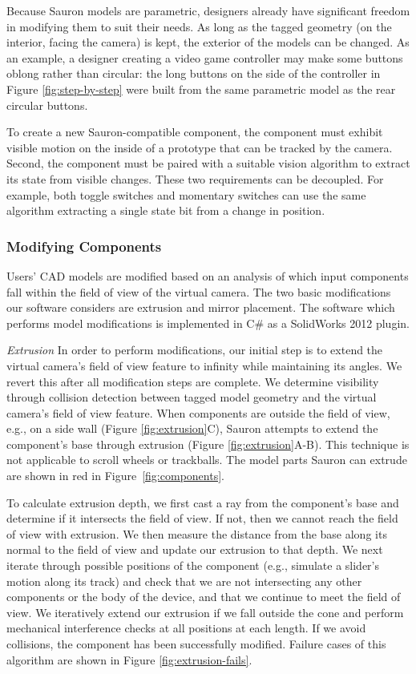 Because Sauron models are parametric, designers already have significant freedom in modifying them to suit their needs. As long as the tagged geometry (on the interior, facing the camera) is kept, the exterior of the models can be changed. As an example, a designer creating a video game controller may make some buttons oblong rather than circular: the long buttons on the side of the controller in Figure \ref{fig:step-by-step} were built from the same parametric model as the rear circular buttons.

To create a new Sauron-compatible component, the component must exhibit visible motion on the inside of a prototype that can be tracked by the camera. Second, the component must be paired with a suitable vision algorithm to extract its state from visible changes. These two requirements can be decoupled. 
For example, both toggle switches and momentary switches can use the same algorithm extracting a single state bit from a change in position.

\subsubsection{Modifying Components}
Users' CAD models are modified based on an analysis of which input components fall within the field of view of the virtual camera. The two basic modifications our software considers are extrusion and mirror placement. The software which performs model modifications is implemented in C\# as a SolidWorks 2012 plugin. 

\emph{Extrusion}
In order to perform modifications, our initial step is to extend the virtual camera's field of view feature to infinity while maintaining its angles. We revert this after all modification steps are complete. We determine visibility through collision detection between tagged model geometry and the virtual camera's field of view feature.
When components are outside the field of view, e.g., on a side wall (Figure \ref{fig:extrusion}C), Sauron attempts to extend the component's base through extrusion (Figure \ref{fig:extrusion}A-B). This technique is not applicable to scroll wheels or trackballs. The model parts Sauron can extrude are shown in red in Figure~\ref{fig:components}.

To calculate extrusion depth, we first cast a ray from the component's base and determine if it intersects the field of view. If not, then we cannot reach the field of view with extrusion. We then measure the distance from the base along its normal to the field of view and update our extrusion to that depth. We next iterate through possible positions of the component (e.g., simulate a slider's motion along its track) and check that we are not intersecting any other components or the body of the device, and that we continue to meet the field of view. We iteratively extend our extrusion if we fall outside the cone and perform mechanical interference checks at all positions at each length. If we avoid collisions, the component has been successfully modified.  Failure cases of this algorithm are shown in Figure \ref{fig:extrusion-fails}.

